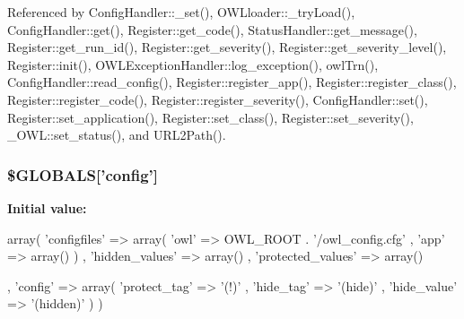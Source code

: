 Referenced by ConfigHandler::\_\-set(), OWLloader::\_\-tryLoad(), ConfigHandler::get(), Register::get\_\-code(), StatusHandler::get\_\-message(), Register::get\_\-run\_\-id(), Register::get\_\-severity(), Register::get\_\-severity\_\-level(), Register::init(), OWLExceptionHandler::log\_\-exception(), owlTrn(), ConfigHandler::read\_\-config(), Register::register\_\-app(), Register::register\_\-class(), Register::register\_\-code(), Register::register\_\-severity(), ConfigHandler::set(), Register::set\_\-application(), Register::set\_\-class(), Register::set\_\-severity(), \_\-OWL::set\_\-status(), and URL2Path().

\subsubsection[{\$GLOBALS}]{\setlength{\rightskip}{0pt plus 5cm}\$GLOBALS\mbox{[}'config'\mbox{]}}\label{config_8php_ab954a2cc6c5b7053b6cabb0c8dea38d1}
{\bfseries Initial value:}
\begin{DoxyCode}
 array(
          'configfiles'                 => array(
                                  'owl' => OWL_ROOT . '/owl_config.cfg'
                                , 'app' => array()
        )
        , 'hidden_values'               => array()
        , 'protected_values'    => array()

        , 'config'                              => array(
                                  'protect_tag' => '(!)'
                                , 'hide_tag'    => '(hide)'
                                , 'hide_value'  => '(hidden)'
        )
)
\end{DoxyCode}
